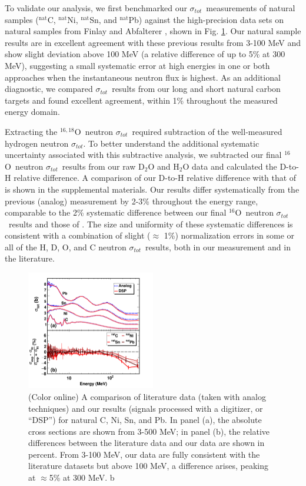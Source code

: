 \documentclass[twocolumn,secnumarabic,amssymb, nobibnotes, aps, prl,
superscriptaddress, nobalancelastpage]{revtex4}
\newcommand{\tot}{\ensuremath{\sigma_{tot}}}
\newcommand{\oSix}{\ensuremath{^{16}}O}
\newcommand{\oSixEight}{\ensuremath{^{16,18}}O}
\begin{document}
To validate our analysis, we first benchmarked our \tot\ measurements of natural samples
($^{\text{nat}}$C, $^{\text{nat}}$Ni, $^{\text{nat}}$Sn, and
$^{\text{nat}}$Pb) against the high-precision data sets on natural samples from Finlay
\cite{Finlay1993} and Abfalterer \cite{Abfalterer2001}, shown in Fig.
\ref{LiteratureBenchmarking}. Our natural sample results
are in excellent agreement with 
these previous results from 3-100 MeV and show slight deviation above 100 MeV (a
relative difference of up to 5\% at 300 MeV), suggesting a small systematic
error at high energies in one or both approaches when the instantaneous neutron
flux is highest. As an additional diagnostic, we compared 
\tot\ results from our long and short natural carbon targets and
found excellent agreement, within 1\% throughout the measured energy domain.

Extracting the \oSixEight\ neutron \tot\ required subtraction of the
well-measured hydrogen neutron \tot. To better understand
the additional systematic uncertainty
associated with this subtractive analysis, we subtracted our final
\oSix\ neutron \tot\ results from our raw D$_{2}$O and H$_{2}$O data and 
calculated the D-to-H relative difference. A
comparison of our D-to-H relative difference with that of
\cite{Abfalterer1998} is shown in the supplemental materials. Our results differ
systematically from the previous (analog) measurement by 2-3\% throughout the
energy range, comparable to the 2\% systematic difference between our final
\oSix\ neutron \tot\ results and those of \cite{Abfalterer2001}. The size and
uniformity of these systematic differences is consistent with
a combination of slight ($\approx$ 1\%) normalization errors
in some or all of the H, D, O, and C neutron \tot\ results,
both in our measurement and in the literature.

\begin{figure}
    \includegraphics[width=0.5\textwidth]{figures/literatureBenchmarking.png}
    \caption{(Color online) A comparison of literature data (taken with analog
    techniques) and our results (signals processed with a digitizer, or ``DSP'')
    for natural C, Ni, Sn, and Pb. In panel (a), the absolute cross sections are shown from
    3-500 MeV; in panel (b), the relative differences between the literature data and
    our data are shown in percent. From 3-100 MeV, our data are fully consistent with the
    literature datasets but above 100 MeV, a difference arises, peaking at
    $\approx$5\% at 300 MeV.
b}
    \label{LiteratureBenchmarking}
\end{figure}
\end{document}
